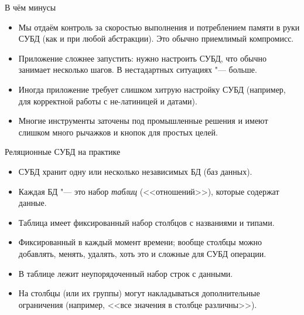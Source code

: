 \begin{frame}{В чём минусы}
	\begin{itemize}
		\item
			Мы отдаём контроль за скоростью выполнения и потреблением памяти в руки СУБД
			(как и при любой абстракции).
			Это обычно приемлимый компромисс.
		\item
			Приложение сложнее запустить: нужно настроить СУБД, что обычно занимает несколько шагов.
			В нестадартных ситуациях "--- больше.
		\item
			Иногда приложение требует слишком хитрую настройку СУБД (например, для корректной работы
			с не-латиницей и датами).
		\item
			Многие инструменты заточены под промышленные решения и имеют слишком много рычажков и кнопок
			для простых целей.
	\end{itemize}
\end{frame}

\begin{frame}{Реляционные СУБД на практике}
	\begin{itemize}
		\item СУБД хранит одну или несколько независимых БД (баз данных).
		\item Каждая БД "--- это набор \textit{таблиц} (<<отношений>>), которые содержат данные.
		\item Таблица имеет фиксированный набор столбцов с названиями и типами.
		\item Фиксированный в каждый момент времени; вообще столбцы можно добавлять, менять, удалять, хоть это и сложные для СУБД операции.
		\item В таблице лежит неупорядоченный набор строк с данными.
		\item На столбцы (или их группы) могут накладываться дополнительные ограничения (например, <<все значения в столбце различны>>).
	\end{itemize}
\end{frame}
